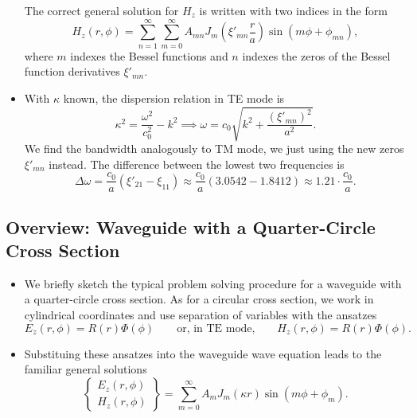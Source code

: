 \documentclass[11pt, a4paper]{article}
\newcommand{\eqtext}[1]{\qquad \text{#1} \qquad}
\begin{document}
\begin{itemize}
    The correct general solution for $ H_{z} $ is written with two indices in the form
    \begin{equation*}
        H_{z}(r, \phi) = \sum_{n=1}^{\infty}\sum_{m = 0}^{\infty}A_{mn}J_{m}\left( \xi'_{mn} \frac{r}{a} \right)\sin(m \phi + \phi_{mn}),
    \end{equation*}
    where $ m $ indexes the Bessel functions and $ n $ indexes the zeros of the Bessel function derivatives $ \xi'_{mn} $.


	\item With $ \kappa $ known, the dispersion relation in TE mode is
	\begin{equation*}
		\kappa^{2} = \frac{\omega^{2}}{c_{0}^{2}} - k^{2} \implies \omega = c_{0}\sqrt{k^{2} + \frac{(\xi'_{mn})^{2}}{a^{2}}}.
	\end{equation*}
	We find the bandwidth analogously to TM mode, we just using the new zeros $ \xi'_{mn} $ instead. The difference between the lowest two frequencies is
	\begin{equation*}
		\Delta \omega = \frac{c_{0}}{a} (\xi'_{21} - \xi_{11}) \approx \frac{c_{0}}{a}(3.0542 - 1.8412) \approx 1.21 \cdot \frac{c_{0}}{a}.
	\end{equation*}
	
\end{itemize}


\subsection{Overview: Waveguide with a Quarter-Circle Cross Section}
\begin{itemize}
	\item We briefly sketch the typical problem solving procedure for a waveguide with a quarter-circle cross section. As for a circular cross section, we work in cylindrical coordinates and use separation of variables with the ansatzes
    \begin{equation*}
        E_{z}(r, \phi) = R(r)\Phi(\phi) \eqtext{or, in TE mode,} H_{z}(r, \phi) = R(r)\Phi(\phi).
    \end{equation*}

    \item Substituing these ansatzes into the waveguide wave equation leads to the familiar general solutions
	\begin{equation*}
        \begin{Bmatrix}
            E_{z}(r, \phi) \\
            H_{z}(r, \phi)
        \end{Bmatrix}
          = \sum_{m = 0}^{\infty} A_{m}J_{m}(\kappa r)\sin(m\phi + \phi_{m}).
	\end{equation*}
\end{itemize}
\end{document}
